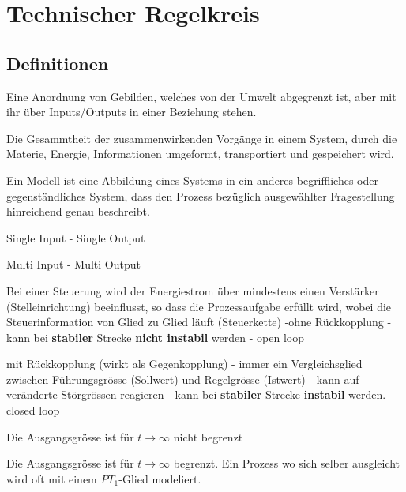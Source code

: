 \section{Technischer Regelkreis}
\subsection{Definitionen }

\begin{description}[leftmargin=2.5cm]
 \item[System]	Eine Anordnung von Gebilden, welches von der Umwelt abgegrenzt ist, aber
								mit ihr über Inputs/Outputs in einer Beziehung stehen.
 \item[Prozess] Die Gesammtheit der zusammenwirkenden Vorgänge in einem System,
        		durch die Materie, Energie, Informationen umgeformt, transportiert und
        		gespeichert wird.
 \item[Modell]	Ein Modell ist eine Abbildung eines Systems in ein anderes begriffliches oder
								gegenständliches System, dass den Prozess bezüglich ausgewählter Fragestellung
								hinreichend genau beschreibt.
 \item[SISO] Single Input - Single Output
 \item[MIMO] Multi Input - Multi Output
 \item[Steuerung]	Bei einer Steuerung wird der Energiestrom über mindestens einen Verstärker (Stelleinrichtung)
									beeinflusst, so dass die Prozessaufgabe erfüllt wird, wobei die Steuerinformation
									von Glied zu Glied läuft (Steuerkette) \newline
									-ohne Rückkopplung \newline
									- kann bei \textbf{stabiler} Strecke \textbf{nicht instabil} werden \newline
									- open loop
 \item[Regelung] mit Rückkopplung (wirkt als Gegenkopplung) \newline
 				 - immer ein Vergleichsglied zwischen Führungsgrösse (Sollwert) und
 				 Regelgrösse (Istwert) \newline
 				 - kann auf veränderte Störgrössen reagieren \newline
 				 - kann bei \textbf{stabiler} Strecke \textbf{instabil} werden. \newline
				 - closed loop
 \item[Prozess ohne Ausgleich]
				Die Ausgangsgrösse ist für $t \rightarrow \infty$ nicht begrenzt
 \item[Prozess mit Ausgleich]
				Die Ausgangsgrösse ist für $t \rightarrow \infty$ begrenzt. Ein Prozess wo sich selber ausgleicht wird oft
				mit einem $PT_1$-Glied modeliert.
				
\end{description}


